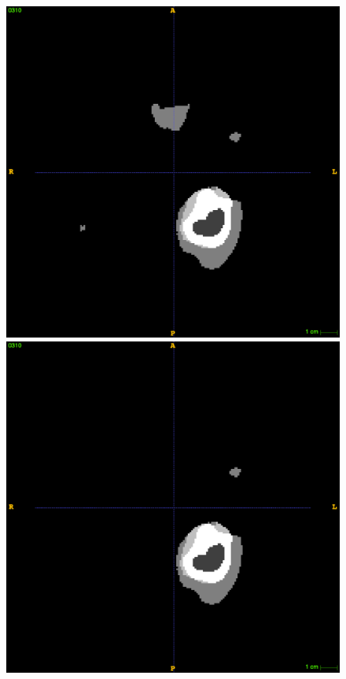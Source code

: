 \documentclass[12pt,a4paper,twoside,openright]{report}
\begin{document}
\begin{figure}[h]
	\centering
	\includegraphics[scale = 0.1]{challenge10_no_post_77}
	\includegraphics[scale = 0.1]{challenge10_with_post_77}
	\\

\end{figure}
\end{document}

